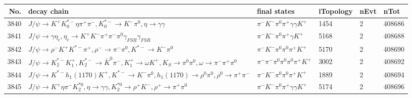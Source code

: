 \begin{table}[htbp] 
\begin{center}
\begin{small}
\begin{tabular}{rlllll}\hline\hline
 No. & decay chain & final states &  iTopology & nEvt & nTot \\\hline
3840&$J/\psi       \rightarrow K^{+}          K_{0}^{*-}     \eta          \pi^{+}        \pi^{-}        , K_{0}^{*-}      \rightarrow K^{-}          \pi^{0}        , \eta           \rightarrow \gamma       \gamma       $&$\pi^{-}        K^{-}          \pi^{0}        \pi^{+}        \gamma       \gamma       K^{+}          $& 1454&    2&408686\\
3841&$J/\psi       \rightarrow \gamma       \eta_{c}    , \eta_{c}     \rightarrow K^{+}          K^{-}          \pi^{+}        \pi^{-}        \pi^{0}        \gamma_{FSR} \gamma_{FSR} $&$\pi^{-}        K^{-}          \pi^{0}        \pi^{+}        \gamma       K^{+}          $& 5168&    2&408688\\
3842&$J/\psi       \rightarrow \rho^{-}      K^{+}          K^{*-}         \pi^{+}        , \rho^{-}       \rightarrow \pi^{-}        \pi^{0}        , K^{*-}          \rightarrow K^{-}          \pi^{0}        $&$\pi^{-}        K^{-}          \pi^{0}        \pi^{0}        \pi^{+}        K^{+}          $& 5170&    2&408690\\
3843&$J/\psi       \rightarrow K_2^{*-}       K_1^{+}        , K_2^{*-}        \rightarrow \bar{K}^{0}   \pi^{-}        , K_1^{+}         \rightarrow \omega         K^{+}          , K_{S}           \rightarrow \pi^{0}        \pi^{0}        , \omega          \rightarrow \pi^{-}        \pi^{+}        \pi^{0}        $&$\pi^{-}        \pi^{-}        \pi^{0}        \pi^{0}        \pi^{0}        \pi^{+}        K^{+}          $& 3002&    2&408692\\
3844&$J/\psi       \rightarrow K^{*-}         h_{1}(1170)    K^{+}          , K^{*-}          \rightarrow K^{-}          \pi^{0}        , h_{1}(1170)     \rightarrow \rho^{0}      \pi^{0}        , \rho^{0}       \rightarrow \pi^{+}        \pi^{-}        $&$\pi^{-}        K^{-}          \pi^{0}        \pi^{0}        \pi^{+}        K^{+}          $& 1889&    2&408694\\
3845&$J/\psi       \rightarrow K^{+}          \eta          \pi^{-}        K_2^{*0}       , \eta           \rightarrow \gamma       \gamma       , K_2^{*0}        \rightarrow \rho^{+}      K^{-}          , \rho^{+}       \rightarrow \pi^{+}        \pi^{0}        $&$\pi^{-}        K^{-}          \pi^{0}        \pi^{+}        \gamma       \gamma       K^{+}          $& 5174&    2&408696\\

\end{tabular}
\end{small}
\end{center}
\end{table}
